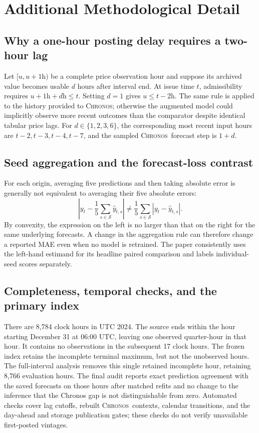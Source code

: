 \documentclass[11pt,letterpaper]{article}
\newcommand{\Chronos}{\textsc{Chronos}}
\begin{document}
\appendix
\section{Additional Methodological Detail}\label{app:additional}
\subsection{Why a one-hour posting delay requires a two-hour lag}
Let $[u,u+1\mathrm{h})$ be a complete price observation hour and suppose its archived value becomes usable $d$ hours after interval end. At issue time $t$, admissibility requires $u+1\mathrm{h}+d\mathrm{h}\leq t$. Setting $d=1$ gives $u\leq t-2\mathrm{h}$. The same rule is applied to the history provided to \Chronos; otherwise the augmented model could implicitly observe more recent outcomes than the comparator despite identical tabular price lags. For $d\in\{1,2,3,6\}$, the corresponding most recent input hours are $t-2,t-3,t-4,t-7$, and the sampled \Chronos\ forecast step is $1+d$.

\subsection{Seed aggregation and the forecast-loss contrast}
For each origin, averaging five predictions and then taking absolute error is generally not equivalent to averaging their five absolute errors:
\begin{equation}
\left|y_t-\frac15\sum_{s\in\mathcal S}\hat y_{t,s}\right|
\ne \frac15\sum_{s\in\mathcal S}|y_t-\hat y_{t,s}|.
\end{equation}
By convexity, the expression on the left is no larger than that on the right for the same underlying forecasts. A change in the aggregation rule can therefore change a reported MAE even when no model is retrained. The paper consistently uses the left-hand estimand for its headline paired comparison and labels individual-seed scores separately.

\subsection{Completeness, temporal checks, and the primary index}
There are 8,784 clock hours in UTC 2024. The source ends within the hour starting December 31 at 06:00 UTC, leaving one observed quarter-hour in that hour. It contains no observations in the subsequent 17 clock hours. The frozen index retains the incomplete terminal maximum, but not the unobserved hours. The full-interval analysis removes this single retained incomplete hour, retaining 8,766 evaluation hours. The final audit reports exact prediction agreement with the saved forecasts on those hours after matched refits and no change to the inference that the Chronos gap is not distinguishable from zero. Automated checks cover lag cutoffs, rebuilt \Chronos\ contexts, calendar transitions, and the day-ahead and storage publication gates; these checks do not verify unavailable first-posted vintages.
\end{document}
